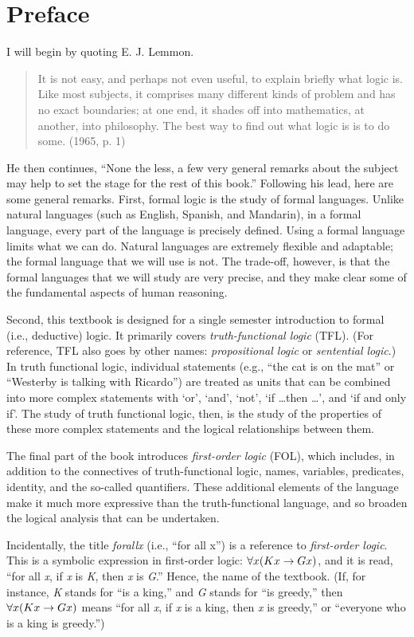 \chapter{Preface}

I will begin by quoting E. J. Lemmon.
\begin{quote}
It is not easy, and perhaps not even useful, to explain briefly what logic is. Like most subjects, it comprises many different kinds of problem and has no exact boundaries; at one end, it shades off into mathematics, at another, into philosophy. The best way to find out what logic is is to do some. (1965, p. 1)
\end{quote}
He then continues, ``None the less, a few very general remarks about the subject may help to set the stage for the rest of this book.'' Following his lead, here are some general remarks. First, formal logic is the study of formal languages. Unlike natural languages (such as English, Spanish, and Mandarin), in a formal language, every part of the language is precisely defined. Using a formal language limits what we can do. Natural languages are extremely flexible and adaptable; the formal language that we will use is not. The trade-off, however, is that the formal languages that we will study are very precise, and they make clear some of the fundamental aspects of human reasoning.

Second, this textbook is designed for a single semester introduction to formal (i.e., deductive) logic. It primarily covers \textit{truth-functional logic} (TFL). (For reference, TFL also goes by other names: \textit{propositional logic} or \textit{sentential logic}.) In truth functional logic, individual statements (e.g., ``the cat is on the mat'' or ``Westerby is talking with Ricardo'') are treated as units that can be combined into more complex statements with  ‘or’, ‘and’, ‘not’, ‘if \ldots then \ldots’, and `if and only if'. The study of truth functional logic, then, is the study of the properties of these more complex statements and the logical relationships between them. 

The final part of the book introduces \textit{first-order logic} (FOL), which includes, in addition to the connectives of truth-functional logic, names, variables, predicates, identity, and the so-called quantifiers. These additional elements of the language make it much more expressive than the truth-functional language, and so broaden the logical analysis that can be undertaken. 


Incidentally, the title \textit{forall\hspace{.10em}x} (i.e., ``for all x'') is a reference to \textit{first-order logic}. This is a symbolic expression in first-order logic: $\forall x(Kx \rightarrow Gx)$, and it is read, “for all \textit{x}, if \textit{x} is \textit{K}, then \textit{x} is \textit{G}.” Hence, the name of the textbook. (If, for instance, \textit{K} stands for ``is a king,'' and \textit{G} stands for ``is greedy,'' then $\forall x(Kx \rightarrow Gx)$ means ``for all \textit{x}, if \textit{x} is a king, then \textit{x} is greedy,'' or ``everyone who is a king is greedy.'') 


